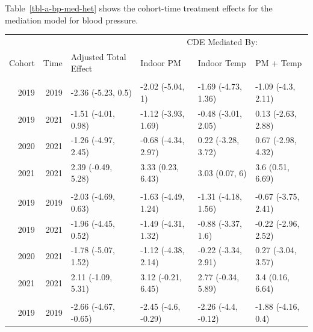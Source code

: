 \documentclass[
  letterpaper,
  DIV=11,
  numbers=noendperiod]{scrartcl}
\makeatletter
\renewenvironment{table}%
  {\renewcommand\familydefault\sfdefault
   \@float{table}}
  {\end@float}
\makeatother
\begin{document}
Table~\ref{tbl-a-bp-med-het} shows the cohort-time treatment effects for
the mediation model for blood pressure.

\hypertarget{tbl-a-bp-med-het}{}
\begin{table}
\caption{\label{tbl-a-bp-med-het}Heterogenous treatment effects for blood pressure mediation model }\tabularnewline

\centering
\begin{tabular}{rrllll}
\toprule
\multicolumn{3}{c}{ } & \multicolumn{3}{c}{CDE Mediated By:} \\
\cmidrule(l{3pt}r{3pt}){4-6}
Cohort & Time & Adjusted Total Effect & Indoor PM & Indoor Temp & PM + Temp\\
\midrule
\addlinespace[0.3em]
\multicolumn{6}{l}{\textbf{Brachial SBP}}\\
\hspace{1em}2019 & 2019 & -2.36 (-5.23, 0.5) & -2.02 (-5.04, 1) & -1.69 (-4.73, 1.36) & -1.09 (-4.3, 2.11)\\
\hspace{1em}2019 & 2021 & -1.51 (-4.01, 0.98) & -1.12 (-3.93, 1.69) & -0.48 (-3.01, 2.05) & 0.13 (-2.63, 2.88)\\
\hspace{1em}2020 & 2021 & -1.26 (-4.97, 2.45) & -0.68 (-4.34, 2.97) & 0.22 (-3.28, 3.72) & 0.67 (-2.98, 4.32)\\
\hspace{1em}2021 & 2021 & 2.39 (-0.49, 5.28) & 3.33 (0.23, 6.43) & 3.03 (0.07, 6) & 3.6 (0.51, 6.69)\\
\addlinespace[0.3em]
\multicolumn{6}{l}{\textbf{Central SBP}}\\
\hspace{1em}2019 & 2019 & -2.03 (-4.69, 0.63) & -1.63 (-4.49, 1.24) & -1.31 (-4.18, 1.56) & -0.67 (-3.75, 2.41)\\
\hspace{1em}2019 & 2021 & -1.96 (-4.45, 0.52) & -1.49 (-4.31, 1.32) & -0.88 (-3.37, 1.6) & -0.22 (-2.96, 2.52)\\
\hspace{1em}2020 & 2021 & -1.78 (-5.07, 1.52) & -1.12 (-4.38, 2.14) & -0.22 (-3.34, 2.91) & 0.27 (-3.04, 3.57)\\
\hspace{1em}2021 & 2021 & 2.11 (-1.09, 5.31) & 3.12 (-0.21, 6.45) & 2.77 (-0.34, 5.89) & 3.4 (0.16, 6.64)\\
\addlinespace[0.3em]
\multicolumn{6}{l}{\textbf{Brachial DBP}}\\
\hspace{1em}2019 & 2019 & -2.66 (-4.67, -0.65) & -2.45 (-4.6, -0.29) & -2.26 (-4.4, -0.12) & -1.88 (-4.16, 0.4)\\

\end{tabular}
\end{table}
\end{document}
